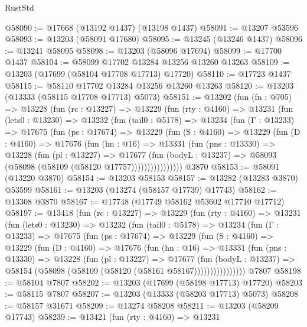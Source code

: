 \begin{lexlean}{RustStd}
\begin{coremodule}
@58090 := @17668 (@13192 @1437) (@13198 @1437)
@58091 := @13207 @53596
@58093 := @13203 (@58091 @17680)
@58095 := @13245 (@13246 @1437)
@58096 := @13241 @58095
@58098 := @13203 (@58096 @17694)
@58099 := @17700 @1437
@58104 := @58099 @17702 @13284 @13256 @13260 @13263
@58109 := @13203 (@17699 (@58104 @17708 @17713) @17720)
@58110 := @17723 @1437
@58115 := @58110 @17702 @13284 @13256 @13260 @13263
@58120 := @13203 (@13333 (@58115 @17708 @17713) @5073)
@58151 := @13202
    (fun (fn : @705) =>
    @13228
      (fun (rc : @13227) =>
      @13229
        (fun (rty : @4160) =>
        @13231
          (fun (lets0 : @13230) =>
          @13232
            (fun (tail0 : @5178) =>
            @13234
              (fun (Γ : @13233) =>
              @17675
                (fun (ps : @17674) =>
                @13229
                  (fun (S : @4160) =>
                  @13229
                    (fun (D : @4160) =>
                    @17676
                      (fun (hn : @16) =>
                      @13331
                        (fun (pns : @13330) =>
                        @13228
                          (fun (pl : @13227) =>
                          @17677
                            (fun (bodyL : @13237) =>
                            @58093 (@58098 (@58109 (@58120 @17757))))))))))))))))
    @3870
@58153 := @58091 (@13220 @3870)
@58154 := @13203 @58153
@58157 := @13282 (@13283 @3870) @53599
@58161 := @13203 (@13274 (@58157 @17739) @17743)
@58162 := @13308 @3870
@58167 := @17748 (@17749 @58162 @53602 @17710 @17712)
@58197 := @13418
    (fun (rc : @13227) =>
    @13229
      (fun (rty : @4160) =>
      @13231
        (fun (lets0 : @13230) =>
        @13232
          (fun (tail0 : @5178) =>
          @13234
            (fun (Γ : @13233) =>
            @17675
              (fun (ps : @17674) =>
              @13229
                (fun (S : @4160) =>
                @13229
                  (fun (D : @4160) =>
                  @17676
                    (fun (hn : @16) =>
                    @13331
                      (fun (pns : @13330) =>
                      @13228
                        (fun (pl : @13227) =>
                        @17677
                          (fun (bodyL : @13237) =>
                          @58154 (@58098 (@58109 (@58120 (@58161 @58167))))))))))))))))
    @7807
@58198 := @58104 @7807
@58202 := @13203 (@17699 (@58198 @17713) @17720)
@58203 := @58115 @7807
@58207 := @13203 (@13333 (@58203 @17713) @5073)
@58208 := @58157 @31671
@58209 := @13274 @58208
@58211 := @13203 (@58209 @17743)
@58239 := @13421
    (fun (rty : @4160) =>
    @13231

\end{coremodule}
\end{lexlean}
